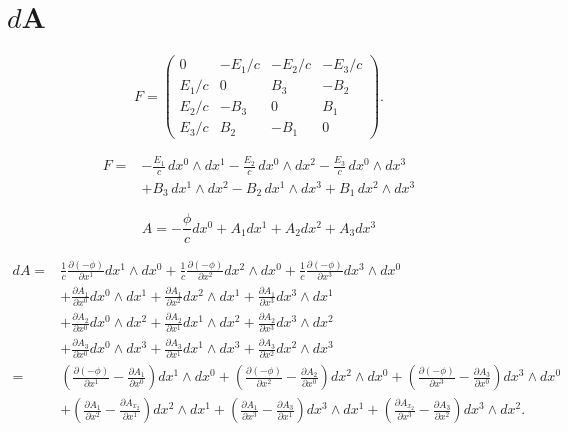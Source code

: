 \section{$d$A
	\label{maxwell:section:dA}}
\begin{equation}
	F = \begin{pmatrix}
		0 & -E_1/c & -E_2/c & -E_3/c \\ E_1/c & 0 & B_3 & -B_2 \\ E_2/c & -B_3 & 0 & B_1 \\ E_3/c & B_2 & -B_1 & 0 
	\end{pmatrix}.
\end{equation}

\begin{align*}
	F = 
	& - \frac{E_{1}}{c} \, dx^0 \wedge dx^1 - \frac{E_{2}}{c} \, dx^0 \wedge dx^2 - \frac{E_{3}}{c} \, dx^0 \wedge dx^3 \\
	& + B_3 \, dx^1 \wedge dx^2 - B_2 \, dx^1 \wedge dx^3 + B_1 \, dx^2 \wedge dx^3
\end{align*}

\begin{equation}
	A = -\frac{\phi}{c}dx^0 + A_1 dx^1 + A_2 dx^2 + A_3 dx^3
\end{equation}

\begin{align*}
	dA = 
	& \frac{1}{c}\frac{\partial (-\phi)}{\partial x^1} dx^1 \wedge dx^0
	+ \frac{1}{c}\frac{\partial (-\phi)}{\partial x^2} dx^2 \wedge dx^0
	+ \frac{1}{c}\frac{\partial (-\phi)}{\partial x^3} dx^3 \wedge dx^0\\
	& + \frac{\partial A_1}{\partial x^0} dx^0 \wedge dx^1
	+ \frac{\partial A_1}{\partial x^2} dx^2 \wedge dx^1
	+ \frac{\partial A_1}{\partial x^3} dx^3 \wedge dx^1\\
	& + \frac{\partial A_2}{\partial x^0} dx^0 \wedge dx^2
	+ \frac{\partial A_2}{\partial x^1} dx^1 \wedge dx^2
	+ \frac{\partial A_2}{\partial x^3} dx^3 \wedge dx^2\\
	& + \frac{\partial A_3}{\partial x^0} dx^0 \wedge dx^3
	+ \frac{\partial A_3}{\partial x^1} dx^1 \wedge dx^3
	+ \frac{\partial A_3}{\partial x^2} dx^2 \wedge dx^3\\[2ex] =
	& \left(\frac{\partial (-\phi)}{\partial x^1}-\frac{\partial A_1}{\partial x^0}\right) dx^1 \wedge dx^0 +
	\left(\frac{\partial (-\phi)}{\partial x^2}-\frac{\partial A_2}{\partial x^0}\right) dx^2 \wedge dx^0 +
	\left(\frac{\partial (-\phi)}{\partial x^3}-\frac{\partial A_3}{\partial x^0}\right) dx^3 \wedge dx^0\\
	& + \left(\frac{\partial A_1}{\partial x^2}-\frac{\partial A_{x_2}}{\partial x^1}\right) dx^2 \wedge dx^1 +
	\left(\frac{\partial A_1}{\partial x^3}-\frac{\partial A_3}{\partial x^1}\right) dx^3 \wedge dx^1 +
	\left(\frac{\partial A_{x_2}}{\partial x^3}-\frac{\partial A_3}{\partial x^2}\right) dx^3 \wedge dx^2.				
\end{align*}